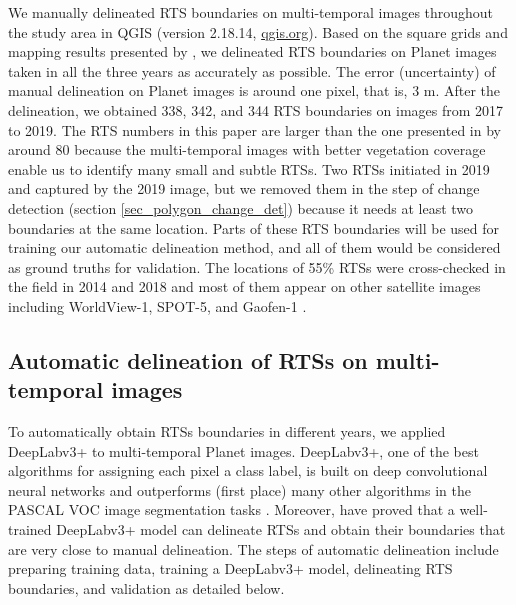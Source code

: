 \documentclass[authoryear,preprint,review,12pt]{elsarticle}
\begin{document}
We manually delineated RTS boundaries on multi-temporal images throughout the study area in QGIS (version 2.18.14, \url{qgis.org}). 
Based on the square grids and mapping results presented by \cite{huang2020using}, we delineated RTS boundaries on Planet images taken in all the three years as accurately as possible. 
The error (uncertainty) of manual delineation on Planet images is around one pixel, that is, 3 m. 
After the delineation, we obtained 338, 342, and 344 RTS boundaries on images from 2017 to 2019. 
The RTS numbers in this paper are larger than the one presented in \cite{huang2020using} by around 80 because the multi-temporal images with better vegetation coverage enable us to identify many small and subtle RTSs. 
Two RTSs initiated in 2019 and captured by the 2019 image, but we removed them in the step of change detection (section \ref{sec_polygon_change_det}) because it needs at least two boundaries at the same location. 
Parts of these RTS boundaries will be used for training our automatic delineation method, and all of them would be considered as ground truths for validation. 
The locations of 55\% RTSs were cross-checked in the field in 2014 and 2018 and most of them  appear on other satellite images including WorldView-1, SPOT-5, and Gaofen-1 \citep{luo2019recent}. 
%



\subsection{Automatic delineation of RTSs on multi-temporal images}
\label{sec_auto_delineating}

To automatically obtain RTSs boundaries in different years, we applied DeepLabv3+ to multi-temporal Planet images. 
DeepLabv3+, one of the best algorithms for assigning each pixel a class label, is built on deep convolutional neural networks \citep{chen2018encoder-decoder} and outperforms (first place) many other algorithms in the PASCAL VOC image segmentation tasks \citep{everingham2015The}.
Moreover, \cite{huang2020using} have proved that a well-trained DeepLabv3+ model can delineate RTSs and obtain their boundaries that are very close to manual delineation.
The steps of automatic delineation include preparing training data, training a DeepLabv3+ model, delineating RTS boundaries, and validation as detailed below. 
\end{document}
